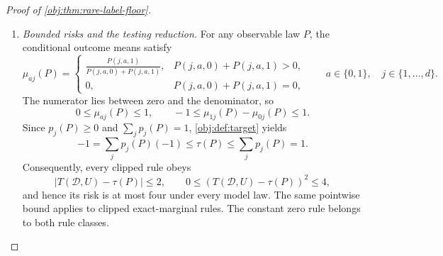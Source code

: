 \documentclass[11pt]{article}
\begin{document}
\begin{proof}[Proof of \cref{obj:thm:rare-label-floor}]
\begin{enumerate}
By \cref{obj:ass:data-product}, the augmented observation laws for the
original-record experiment are
\[
\mathsf P_{\mathrm{ann},\pm}
:=
\bigl(\mathsf P_{\mathrm{lab},\pm}
      \otimes\pi_{XA}^{\otimes m}\bigr)
\otimes\mathrm{Uniform}[0,1].
\]
First removing the common seed factor and then the common auxiliary
factor gives
\[
\begin{aligned}
\operatorname{TV}
(\mathsf P_{\mathrm{ann},+},\mathsf P_{\mathrm{ann},-})
&=
\operatorname{TV}
\bigl(
\mathsf P_{\mathrm{lab},+}\otimes\pi_{XA}^{\otimes m},
\mathsf P_{\mathrm{lab},-}\otimes\pi_{XA}^{\otimes m}
\bigr)\\
&=
\operatorname{TV}
(\mathsf P_{\mathrm{lab},+},\mathsf P_{\mathrm{lab},-})
\le\frac14.
\end{aligned}
\]
For \(m=0\), the auxiliary array space consists of the empty array and its
law is a point mass, so the same argument applies.

\item \textit{Bounded risks and the testing reduction.}
For any observable law \(P\), the conditional outcome means satisfy
\begingroup\small
\[
\mu_{aj}(P)=
\begin{cases}
\displaystyle
\frac{P(j,a,1)}{P(j,a,0)+P(j,a,1)},
& P(j,a,0)+P(j,a,1)>0,\\[6pt]
0,&P(j,a,0)+P(j,a,1)=0,
\end{cases}
\qquad a\in\{0,1\},\quad j\in\{1,\ldots,d\}.
\]
\endgroup
The numerator lies between zero and the denominator, so
\[
0\le\mu_{aj}(P)\le1,
\qquad
-1\le\mu_{1j}(P)-\mu_{0j}(P)\le1.
\]
Since \(p_j(P)\ge0\) and \(\sum_jp_j(P)=1\),
\cref{obj:def:target} yields
\[
-1
=
\sum_jp_j(P)(-1)
\le\tau(P)
\le
\sum_jp_j(P)
=1.
\]
Consequently, every clipped rule obeys
\[
|T(\mathcal D,U)-\tau(P)|\le2,
\qquad
0\le(T(\mathcal D,U)-\tau(P))^2\le4,
\]
and hence its risk is at most four under every model law. The same
pointwise bound applies to clipped exact-marginal rules. The constant
zero rule belongs to both rule classes.


\end{enumerate}
\end{proof}
\end{document}
